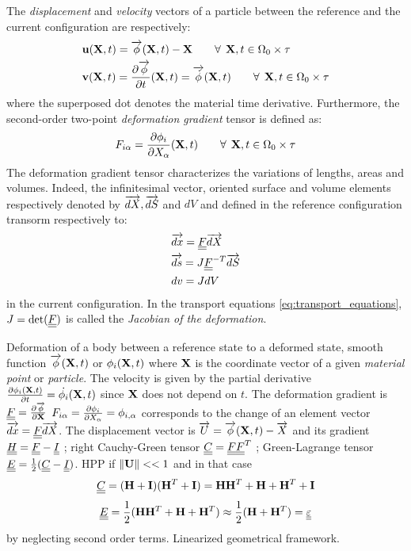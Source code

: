 The \textit{displacement} and \textit{velocity} vectors of a particle between the reference and the current configuration are respectively:
\begin{align*}
  &\mathbf{u}(\mathbf{X},t)={\overrightarrow{\phi}}(\mathbf{X},t) - \mathbf{X} \qquad \forall\:\: \mathbf{X},t \in \Omega_0\times \tau \\
  &\mathbf{v}(\mathbf{X},t)=\frac{\partial {\overrightarrow{\phi}}}{\partial t}(\mathbf{X},t) = {\overrightarrow{\dot{\phi}}}(\mathbf{X},t) \qquad  \forall\: \: \mathbf{X},t \in \Omega_0\times \tau
\end{align*}
where the superposed dot denotes the material time derivative. Furthermore, the second-order two-point \textit{deformation gradient} tensor is defined as:
\begin{equation*}
  F_{i\alpha}=\frac{\partial \phi_i}{\partial X_{\alpha}}(\mathbf{X},t) \qquad \forall\:\: \mathbf{X},t \in \Omega_0\times \tau
\end{equation*}
The deformation gradient tensor characterizes the variations of lengths, areas and volumes. Indeed, the infinitesimal vector, oriented surface and volume elements respectively denoted by ${\overrightarrow{dX}},{\overrightarrow{dS}}$ and $dV$ and defined in the reference configuration transorm respectively to:
\begin{equation}
  \label{eq:transport_equations}
  \begin{aligned}
    & {\overrightarrow{dx}}={\underline{\underline{F}}}{\overrightarrow{dX}} \\
    & {\overrightarrow{ds}}=J{\underline{\underline{F}}}^{-T}{\overrightarrow{dS}} \\
    & dv=JdV 
  \end{aligned}
\end{equation}
in the current configuration. In the transport equations \eqref{eq:transport_equations}, $J=\det({\underline{\underline{F}}})$ is called the \textit{Jacobian of the deformation}.

Deformation of a body between a reference state to a deformed state, smooth function ${\overrightarrow{\phi}}(\mathbf{X},t)$ or $\phi_i(\mathbf{X},t)$ where $\mathbf{X}$ is the coordinate vector of a given \textit{material point} or \textit{particle}. The velocity is given by the partial derivative $\frac{\partial \phi_i(\mathbf{X},t)}{\partial t}=\dot{\phi_i}(\mathbf{X},t)$ since $\mathbf{X}$ does not depend on $t$. The deformation gradient is ${\underline{\underline{F}}} = \frac{\partial {\overrightarrow{\phi}}}{\partial \mathbf{X}}$ $F_{i\alpha} = \frac{\partial \phi_i}{\partial X_\alpha}=\phi_{i,\alpha}$ corresponds to the change of an element vector ${\overrightarrow{dx}}={\underline{\underline{F}}}{\overrightarrow{dX}}$. The displacement vector is ${\overrightarrow{U}}= {\overrightarrow{\phi}}(\mathbf{X},t)-{\overrightarrow{X}}$ and its gradient ${\underline{\underline{H}}}={\underline{\underline{F}}}-{\underline{\underline{I}}}$ ; right Cauchy-Green tensor ${\underline{\underline{C}}}={\underline{\underline{F}}}{\underline{\underline{F}}}^T$ ; Green-Lagrange tensor ${\underline{\underline{E}}}=\frac{1}{2}({\underline{\underline{C}}}-{\underline{\underline{I}}})$. HPP if $\left\Vert\mathbf{U}\right\Vert<<1$ and in that case\begin{equation*}
  {\underline{\underline{C}}}=(\mathbf{H}+\mathbf{I})(\mathbf{H}^T + \mathbf{I}) = \mathbf{H} \mathbf{H}^T +\mathbf{H} + \mathbf{H}^T + \mathbf{I}
\end{equation*}
\begin{equation*}
  {\underline{\underline{E}}}=\frac{1}{2}(\mathbf{H} \mathbf{H}^T +\mathbf{H} + \mathbf{H}^T) \approx \frac{1}{2}(\mathbf{H} + \mathbf{H}^T) = {\underline{\underline{\varepsilon}}} 
\end{equation*}
by neglecting second order terms. Linearized geometrical framework.
